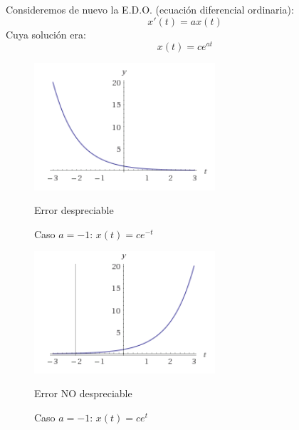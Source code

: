 \documentclass[8pt]{beamer}
\begin{document}
\begin{frame}
\begin{example}
Consideremos de nuevo la E.D.O. (ecuación diferencial ordinaria):
\begin{equation}
x'(t) =ax(t)
\end{equation}
Cuya solución era:
\begin{equation}
x(t) =ce^{at}
\end{equation}
\begin{minipage}{0.48\textwidth}
\begin{center}
\begin{figure}[hbtp]
\centering
\includegraphics[width = 0.6\textwidth]{img/exp.png}
\caption{Caso $a=-1$: $x(t)=ce^{-t}$}
Error despreciable
\end{figure}
\end{center}
\end{minipage}
\begin{minipage}{0.48\textwidth}
\begin{center}
\begin{figure}[hbtp]
\centering
\includegraphics[width = 0.6\textwidth]{img/exp2.png}
\caption{Caso $a=-1$: $x(t)=ce^{t}$}
Error NO despreciable
\end{figure}
\end{center}
\end{minipage}
\end{example}
\end{frame}
\end{document}
